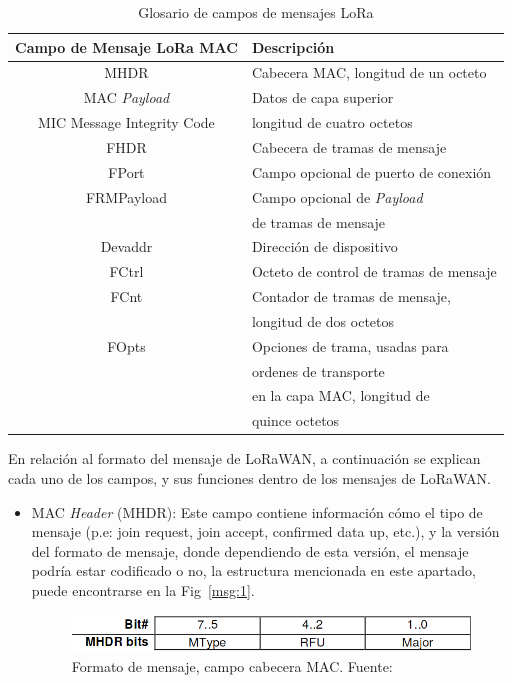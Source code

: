 \begin{justify}
\begin{table}[!ht]
\begin{tabular}{|c|l|}
\hline
Campo de Mensaje LoRa MAC & Descripción \\\hline
MHDR & Cabecera	MAC, longitud de un octeto\\\hline
MAC \textit{Payload}	& Datos de capa superior\\\hline
MIC	Message Integrity Code & longitud de cuatro octetos\\\hline
FHDR  &	Cabecera de tramas de mensaje\\\hline
FPort	& Campo opcional de puerto de conexión\\\hline
FRMPayload	& Campo opcional de \textit{Payload} \\&de tramas de mensaje\\\hline
Devaddr	& Dirección de dispositivo\\\hline
FCtrl & Octeto de control de tramas de mensaje\\\hline
FCnt &	Contador de tramas de mensaje,\\& longitud de dos octetos\\\hline
FOpts &	Opciones de trama, usadas para \\&ordenes de transporte\\ & en la capa MAC, longitud de \\&quince octetos\\\hline
\end{tabular}
\caption{Glosario de campos de mensajes LoRa}
\label{tab:loramsg}
\end{table}
En relación al formato del mensaje de LoRaWAN, a continuación se explican cada uno de los campos, y sus funciones dentro de los mensajes de LoRaWAN.\\
\begin{itemize}
\item MAC \textit{Header} (MHDR): Este campo contiene información cómo el tipo de mensaje (p.e: join request, join accept, confirmed data up, etc.), y la versión del formato de mensaje, donde dependiendo de esta versión, el mensaje podría estar codificado o no, la estructura mencionada en este apartado, puede encontrarse en la Fig~\ref{msg:1}.
\begin{figure}[!ht]
\includegraphics[scale=0.5]{images/mensaje1}
\caption{Formato de mensaje, campo cabecera MAC. Fuente:~\cite{Sornin}}

\end{figure}
\end{itemize}
\end{justify}
